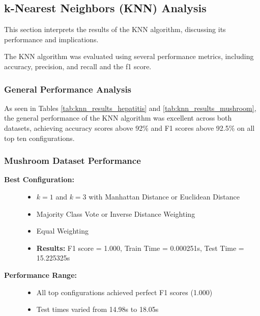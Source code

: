 \subsection{k-Nearest Neighbors (KNN) Analysis}
\label{subsubsec:discussion-knn}

This section interprets the results of the KNN algorithm, discussing its performance and implications.

The KNN algorithm was evaluated using several performance metrics, including accuracy, precision, and recall and the f1 score.

\subsubsection*{General Performance Analysis}
As seen in Tables \ref{tab:knn_results_hepatitis} and \ref{tab:knn_results_mushroom}, the general performance of the KNN algorithm was excellent across both datasets,
achieving accuracy scores above 92\% and F1 scores above 92.5\% on all top ten configurations.

\subsubsection{Mushroom Dataset Performance}

\begin{description}
    \item[\textbf{Best Configuration:}]\leavevmode
        \begin{itemize}
            \item $k = 1$ and $k = 3$ with Manhattan Distance or Euclidean Distance
            \item Majority Class Vote or Inverse Distance Weighting
            \item Equal Weighting
            \item \textbf{Results:} F1 score = 1.000, Train Time = 0.000251s, Test Time = 15.225325s
        \end{itemize}
    
    \item[\textbf{Performance Range:}]\leavevmode
        \begin{itemize}
            \item All top configurations achieved perfect F1 scores (1.000)
            \item Test times varied from 14.98s to 18.05s
        \end{itemize}
\end{description}

